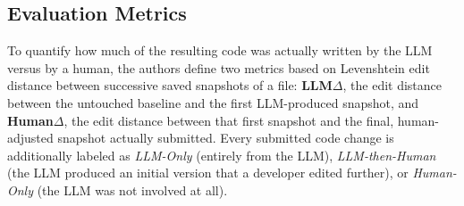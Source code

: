 \subsection{Evaluation Metrics}
\label{sec:evalmetrics}
To quantify how much of the resulting code was actually written by
the LLM versus by a human, the authors define two metrics based on
Levenshtein edit distance between successive saved snapshots of a
file: \textbf{LLM$\Delta$}, the edit distance between the untouched
baseline and the first LLM-produced snapshot, and
\textbf{Human$\Delta$}, the edit distance between that first snapshot
and the final, human-adjusted snapshot actually submitted. Every
submitted code change is additionally labeled as \emph{LLM-Only}
(entirely from the LLM), \emph{LLM-then-Human} (the LLM produced an
initial version that a developer edited further), or \emph{Human-Only}
(the LLM was not involved at all).
